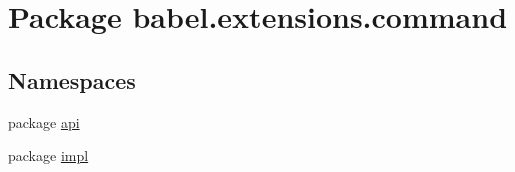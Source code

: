 \hypertarget{namespacebabel_1_1extensions_1_1command}{\section{Package babel.\-extensions.\-command}
\label{namespacebabel_1_1extensions_1_1command}
}
\subsection*{Namespaces}
\begin{DoxyCompactItemize}
\item 
package \hyperlink{namespacebabel_1_1extensions_1_1command_1_1api}{api}
\item 
package \hyperlink{namespacebabel_1_1extensions_1_1command_1_1impl}{impl}
\end{DoxyCompactItemize}
